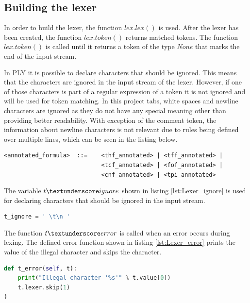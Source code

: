 \subsection{Building the lexer}\label{sec:ImplementationBuildingLexer}

In order to build the lexer, the function $lex.lex()$ is used. After the lexer has been created, the function $lex.token()$ returns matched tokens. The function $lex.token()$ is called until it returns a token of the type $None$ that marks the end of the input stream. 

In \ac{PLY} it is possible to declare characters that should be ignored. This means that the characters are ignored in the input stream of the lexer. However, if one of those characters is part of a regular expression of a token it is not ignored and will be used for token matching. In this project tabs, white spaces and newline characters are ignored as they do not have any special meaning other than providing better readability. With exception of the comment token, the information about newline characters is not relevant due to rules being defined over multiple lines, which can be seen in the listing below.

\begin{lstlisting}[caption= Example of rules defined over multiple lines]
<annotated_formula>  ::=    <thf_annotated> | <tff_annotated> |
                            <tcf_annotated> | <fof_annotated> |
                            <cnf_annotated> | <tpi_annotated>
\end{lstlisting}

The variable $t\textunderscore ignore$ shown in listing \ref{lst:Lexer_ignore} is used for declaring characters that should be ignored in the input stream.

\begin{lstlisting}[language=Python,basicstyle=\scriptsize	,caption= Lexer ignore function,label= lst:Lexer_ignore]
t_ignore = ' \t\n '
\end{lstlisting}

The function $t\textunderscore error$ is called when an error occurs during lexing.
The defined error function shown in listing \ref{lst:Lexer_error} prints the value of the illegal character and skips the character.

\begin{lstlisting}[language=Python,basicstyle=\scriptsize	,caption= Lexer error function,label= lst:Lexer_error]
def t_error(self, t):
    print("Illegal character '%s'" % t.value[0])
    t.lexer.skip(1)
)
\end{lstlisting}


